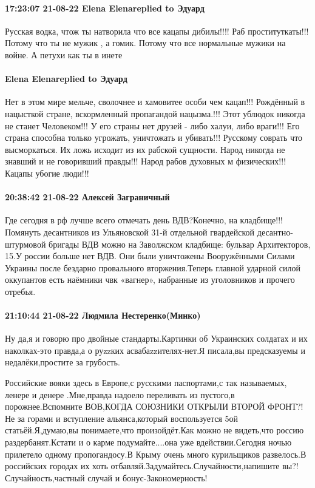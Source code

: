 \paragraph{17:23:07 21-08-22 Elena Elenareplied to Эдуард}

Русская водка, чтож ты натворила что все кацапы дибилы!!!! Раб проституткаты!!!
Потому что ты не мужик , а гомик. Потому что все нормальные мужики на войне. А
петухи как ты в инете🤮🤮🤮🤮

\paragraph{Elena Elenareplied to Эдуард}

Нет в этом мире мельче, сволочнее и хамовитее особи чем кацап!!! Рождённый в
нацысткой стране, вскормленный пропагандой нацызма.!!! Этот ублюдок никогда не
станет Человеком!!! У его страны нет друзей - либо халуи, либо враги!!! Его
страна способна только угрожать, уничтожать и убивать!!! Русскому соврать что
высморкаться. Их ложь исходит из их рабской сущности. Народ никогда не знавший
и не говоривший правды!!! Народ рабов духовных м физических!!! Кацапы убогие
люди!!!

\paragraph{20:38:42 21-08-22 Алексей Заграничный}

Где сегодня в рф лучше всего отмечать день ВДВ?Конечно, на кладбище!!!Помянуть десантников из Ульяновской 31-й отдельной гвардейской десантно-штурмовой бригады ВДВ можно на Заволжском кладбище: бульвар Архитекторов, 15.У россии больше нет ВДВ. Они были уничтожены Вооружёнными Силами Украины после бездарно провального вторжения.Теперь главной ударной силой оккупантов есть наёмники чвк «вагнер», набранные из уголовников и прочего отребья.

\paragraph{21:10:44 21-08-22 Людмила Нестеренко(Минко)}

Ну да,я и говорю про двойные стандарты.Картинки об Украинских солдатах и их
наколках-это правда,а о руzzких асвабаzzителях-нет.Я писала,вы предсказуемы и
недалёки,простите за грубость.

Российские вояки здесь в Европе,с русскими паспортами,с так называемых, ленере
и денере .Мне,правда надоело переливать из пустого,в порожнее.Вспомните
ВОВ,КОГДА СОЮЗНИКИ ОТКРЫЛИ ВТОРОЙ ФРОНТ?!Не за горами и вступление
альянса,который воспользуется 5ой статьёй.Я,думаю,вы понимаете,что
произойдёт.Как можно не видеть,что россию раздербанят.Кстати и о карме
подумайте....она уже вдействии.Сегодня ночью прилетело одному пропогандосу.В
Крыму очень много курильщиков развелось.В российских городах их хоть
отбавляй.Задумайтесь.Случайности,напишите вы?!Случайность,частный случай и
бонус-Закономерность!

